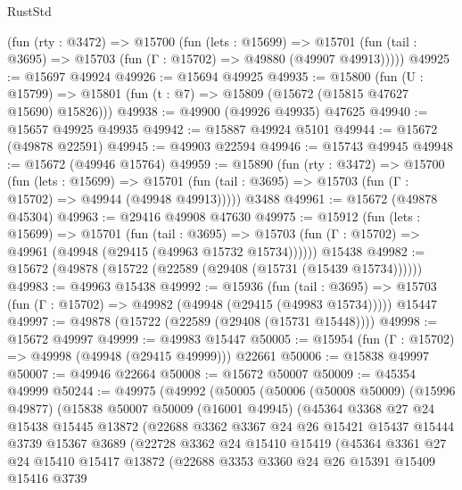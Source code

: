 \begin{lexlean}{RustStd}
\begin{coremodule}
    (fun (rty : @3472) =>
    @15700
      (fun (lets : @15699) =>
      @15701 (fun (tail : @3695) => @15703 (fun (Γ : @15702) => @49880 (@49907 @49913)))))
@49925 := @15697 @49924
@49926 := @15694 @49925
@49935 := @15800
    (fun (U : @15799) => @15801 (fun (t : @7) => @15809 (@15672 (@15815 @47627 @15690) @15826)))
@49938 := @49900 (@49926 @49935) @47625
@49940 := @15657 @49925 @49935
@49942 := @15887 @49924 @5101
@49944 := @15672 (@49878 @22591)
@49945 := @49903 @22594
@49946 := @15743 @49945
@49948 := @15672 (@49946 @15764)
@49959 := @15890
    (fun (rty : @3472) =>
    @15700
      (fun (lets : @15699) =>
      @15701 (fun (tail : @3695) => @15703 (fun (Γ : @15702) => @49944 (@49948 @49913)))))
    @3488
@49961 := @15672 (@49878 @45304)
@49963 := @29416 @49908 @47630
@49975 := @15912
    (fun (lets : @15699) =>
    @15701
      (fun (tail : @3695) =>
      @15703 (fun (Γ : @15702) => @49961 (@49948 (@29415 (@49963 @15732 @15734))))))
    @15438
@49982 := @15672 (@49878 (@15722 (@22589 (@29408 (@15731 (@15439 @15734))))))
@49983 := @49963 @15438
@49992 := @15936
    (fun (tail : @3695) => @15703 (fun (Γ : @15702) => @49982 (@49948 (@29415 (@49983 @15734)))))
    @15447
@49997 := @49878 (@15722 (@22589 (@29408 (@15731 @15448))))
@49998 := @15672 @49997
@49999 := @49983 @15447
@50005 := @15954 (fun (Γ : @15702) => @49998 (@49948 (@29415 @49999))) @22661
@50006 := @15838 @49997
@50007 := @49946 @22664
@50008 := @15672 @50007
@50009 := @45354 @49999
@50244 := @49975
    (@49992
      (@50005
        (@50006
          (@50008 @50009)
          (@15996 @49877)
          (@15838
            @50007
            @50009
            (@16001 @49945)
            (@45364
              @3368
              @27
              @24
              @15438
              @15445
              @13872
              (@22688
                @3362
                @3367
                @24
                @26
                @15421
                @15437
                @15444
                @3739
                @15367
                @3689
                (@22728
                  @3362
                  @24
                  @15410
                  @15419
                  (@45364
                    @3361
                    @27
                    @24
                    @15410
                    @15417
                    @13872
                    (@22688
                      @3353
                      @3360
                      @24
                      @26
                      @15391
                      @15409
                      @15416
                      @3739

\end{coremodule}
\end{lexlean}

